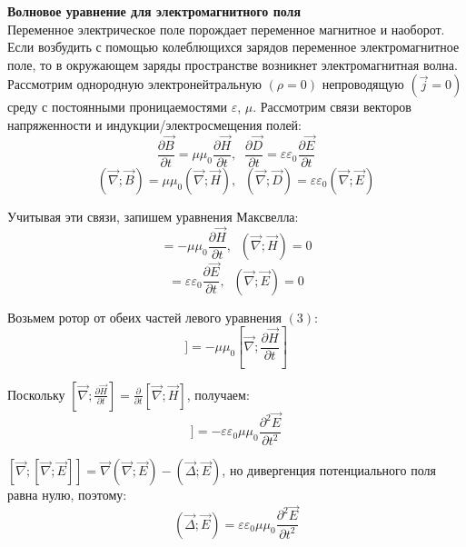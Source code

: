 \documentclass{article}
\begin{document}
	
	\textbf{Волновое уравнение для электромагнитного поля}\\

	Переменное электрическое поле порождает переменное магнитное и наоборот. Если возбудить с помощью колеблющихся зарядов переменное электромагнитное поле, то в окружающем заряды пространстве возникнет электромагнитная волна.\\

	Рассмотрим однородную электронейтральную $(\rho = 0)$ непроводящую $(\vec j = 0)$ среду с постоянными проницаемостями $\varepsilon$, $\mu$. Рассмотрим связи векторов напряженности и индукции/электросмещения полей:
	\begin{equation}
		\frac{\partial\vec B}{\partial t} = \mu\mu_0\frac{\partial\vec H}{\partial t},\;\;\frac{\partial\vec D}{\partial t}=\varepsilon\varepsilon_0\frac{\partial\vec E}{\partial t}
	\end{equation}
	\begin{equation}
		(\vec\nabla;\vec B) = \mu\mu_0(\vec\nabla;\vec H),\;\;(\vec\nabla;\vec D)=\varepsilon\varepsilon_0(\vec\nabla;\vec E)
	\end{equation}

	Учитывая эти связи, запишем уравнения Максвелла:
	\begin{equation}
		[\vec\nabla;\vec E] = -\mu\mu_0\frac{\partial\vec H}{\partial t},\;\;(\vec\nabla;\vec H) = 0
	\end{equation}
	\begin{equation}
		[\vec\nabla;\vec H] = \varepsilon\varepsilon_0\frac{\partial\vec E}{\partial t},\;\;(\vec\nabla;\vec E)=0
	\end{equation}
	
	Возьмем ротор от обеих частей левого уравнения $(3)$:
	\begin{equation}
		[\vec\nabla;[\vec\nabla;\vec E]]=-\mu\mu_0[\vec\nabla;\frac{\partial\vec H}{\partial t}]
	\end{equation}

	Поскольку $[\vec\nabla;\frac{\partial\vec H}{\partial t}]=\frac{\partial}{\partial t}[\vec\nabla;\vec H]$, получаем: 
	\begin{equation}
		[\vec\nabla;[\vec\nabla;\vec E]]=-\varepsilon\varepsilon_0\mu\mu_0\frac{\partial^2\vec E}{\partial t^2}
	\end{equation}

	$[\vec\nabla;[\vec\nabla;\vec E]]=\vec\nabla(\vec\nabla;\vec E)-(\vec\Delta;\vec E)$, но дивергенция потенциального поля равна нулю, поэтому:
	\begin{equation}
		(\vec\Delta;\vec E) = \varepsilon\varepsilon_0\mu\mu_0\frac{\partial^2\vec E}{\partial t^2}
	\end{equation}
\end{document}
